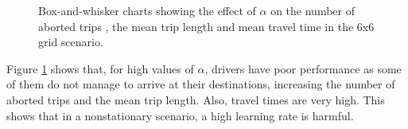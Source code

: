 \documentclass{RITA}
\begin{document}
\begin{figure}
  \centering
  \caption{Box-and-whisker charts showing the effect of $\alpha$ on the number of aborted trips , the mean trip length  and mean travel time  in the 6x6 grid scenario.}
  \label{fig:qLearningAlpha-grid}
\end{figure}

Figure \ref{fig:qLearningAlpha-grid} shows that, for high values of $\alpha$, drivers have poor performance as some of them do not manage to arrive at their destinations, increasing the number of aborted trips and the mean trip length. Also, travel times are very high. This shows that in a nonstationary scenario, a high learning rate is harmful.
\end{document}
